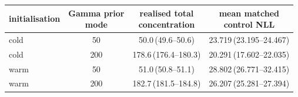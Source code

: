 \begin{tabular}{lccc}
\toprule
initialisation & \shortstack{Gamma prior\\mode} & \shortstack{realised total\\concentration} & \shortstack{mean matched\\control NLL} \\
\midrule
cold & 50 & 50.0\,(49.6--50.6) & 23.719\,(23.195--24.467) \\
cold & 200 & 178.6\,(176.4--180.3) & 20.291\,(17.602--22.035) \\
warm & 50 & 51.0\,(50.8--51.1) & 28.802\,(26.771--32.415) \\
warm & 200 & 182.7\,(181.5--184.8) & 26.207\,(25.281--27.394) \\
\bottomrule
\end{tabular}

